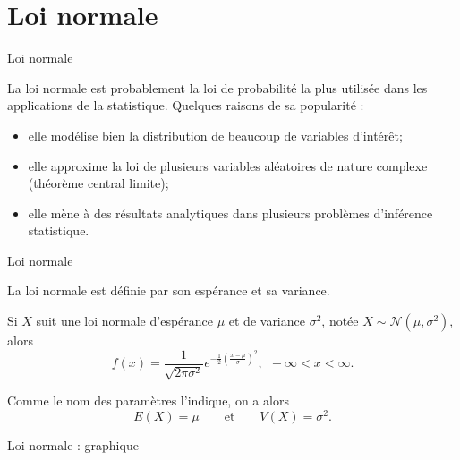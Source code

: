 \documentclass{BeamerTemplate}
\begin{document}
\section{Loi normale}

\begin{frame}[t]{Loi normale}

\vspace{0.1in}
La loi normale est probablement la loi de probabilité la plus utilisée dans les
applications de la statistique. Quelques raisons de sa popularité :
\vspace{0.1in}
\begin{itemize}
\item elle modélise bien la distribution de beaucoup de variables d'intérêt;
\item elle approxime la loi de plusieurs variables aléatoires de nature complexe (théorème central limite);
\item elle mène à des résultats analytiques dans plusieurs problèmes d'inférence statistique.
\end{itemize}
\end{frame}


\begin{frame}[t]{Loi normale}

La loi normale est définie par son espérance et sa variance.

\vspace{0.5in}
Si $X$ suit une loi normale d'espérance $\mu$ et de variance $\sigma^2$, notée
$X\sim \mathcal{N}(\mu,\sigma^2)$, alors
$$f(x)=\frac{1}{\sqrt{2\pi\sigma^2}}
e^{-\frac{1}{2}\left(\frac{x-\mu}{\sigma}\right)^2},\ \
-\infty<x<\infty.$$

\vspace{0.1in}
Comme le nom des paramètres l'indique, on a alors
$$E(X) = \mu \qquad \text{et} \qquad V(X) = \sigma^2.$$

\end{frame}


\begin{frame}{Loi normale : graphique}
\begin{center}
\end{center}

\end{frame}
\end{document}

